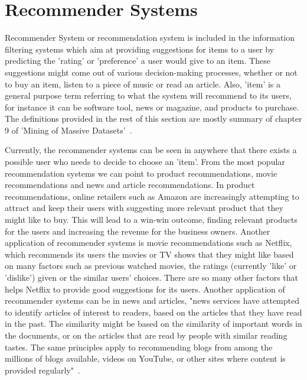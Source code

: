 







\section{Recommender Systems}

Recommender System or recommendation system is included in the information filtering systems which aim at providing suggestions for items to a user by predicting the 'rating' or 'preference' a user would give to an item\cite{isinkaye2015recommendation,ricci2011introduction}. These suggestions might come out of various decision-making processes, whether or not to buy an item, listen to a piece of music or read an article. Also, 'item' is a general purpose term referring to what the system will recommend to its users, for instance it can be software tool, news or magazine, and products to purchase. The definitions provided in the rest of this section are mostly summary of chapter 9 of 'Mining of Massive Datasets'~\cite{rajaraman2011mining}.

Currently, the recommender systems can be seen in anywhere that there exists a possible user who needs to decide to choose an 'item'. From the most popular recommendation systems we can point to product recommendations, movie recommendations and news and article recommendations. In product recommendations, online retailers such as Amazon are increasingly attempting to attract and keep their users with suggesting more relevant product that they might like to buy. This will lead to a win-win outcome, finding relevant products for the users and increasing the revenue for the business owners. Another application of recommender systems is movie recommendations such as Netflix, which recommends its users the movies or TV shows that they might like based on many factors such as previous watched movies, the ratings (currently 'like' or 'dislike') given or the similar users' choices. There are so many other factors that helps Netflix to provide good suggestions for its users. Another application of recommender systems can be in news and articles, "news services have attempted to identify articles of interest to readers, based on the articles that they have read in the past. The similarity might be based on the similarity of important words in the
documents, or on the articles that are read by people with similar reading
tastes. The same principles apply to recommending blogs from among
the millions of blogs available, videos on YouTube, or other sites where content is provided regularly"~\cite{rajaraman2011mining}.





